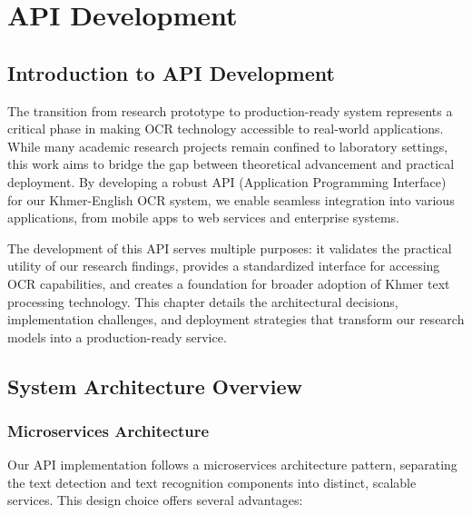 \chapter{API Development}
\label{ch:development}

{\englishfont\fontsize{13.5pt}{17pt}\selectfont

\vspace{-1cm}
\setlength{\parindent}{0pt}
\vspace{0.3cm}

\section{Introduction to API Development}
\label{sec:api-introduction}

The transition from research prototype to production-ready system represents a critical phase in making OCR technology accessible to real-world applications. While many academic research projects remain confined to laboratory settings, this work aims to bridge the gap between theoretical advancement and practical deployment. By developing a robust API (Application Programming Interface) for our Khmer-English OCR system, we enable seamless integration into various applications, from mobile apps to web services and enterprise systems.

The development of this API serves multiple purposes: it validates the practical utility of our research findings, provides a standardized interface for accessing OCR capabilities, and creates a foundation for broader adoption of Khmer text processing technology. This chapter details the architectural decisions, implementation challenges, and deployment strategies that transform our research models into a production-ready service.

\section{System Architecture Overview}
\label{sec:system-architecture}

\subsection{Microservices Architecture}
\label{subsec:microservices}

Our API implementation follows a microservices architecture pattern, separating the text detection and text recognition components into distinct, scalable services. This design choice offers several advantages:

}
